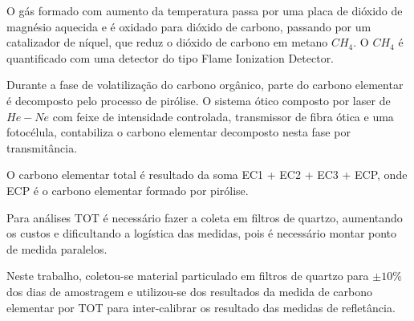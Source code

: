 O gás formado com aumento da temperatura passa por uma placa de dióxido de magnésio 
aquecida e é oxidado para dióxido de carbono, passando por um catalizador de níquel, 
que reduz o dióxido de carbono em metano $CH_4$.
O $CH_4$ é quantificado com uma detector do tipo 
Flame Ionization Detector.

Durante a fase de volatilização do carbono orgânico, parte do carbono elementar
é decomposto pelo processo de pirólise. 
O sistema ótico composto por laser de $He-Ne$ com feixe de intensidade controlada, 
transmissor de fibra ótica e uma fotocélula, contabiliza o carbono elementar
decomposto nesta fase por transmitância.

O carbono elementar total é resultado da soma EC1 + EC2 + EC3 + ECP,
onde ECP é o carbono elementar formado por pirólise. 

Para análises TOT é necessário fazer a coleta em filtros
de quartzo, aumentando os custos e dificultando a logística das medidas, 
pois é necessário montar ponto de medida paralelos.  

Neste trabalho, coletou-se material particulado em filtros de 
quartzo para $\pm 10\%$ dos dias de amostragem e utilizou-se
dos resultados da medida de carbono elementar por TOT 
para inter-calibrar os resultado das medidas de refletância. 

